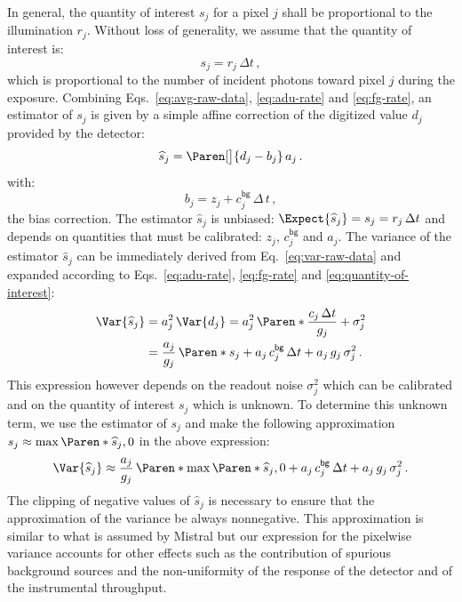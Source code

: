 \documentclass[a4paper,11pt,twoside]{scrartcl}
\newcommand*{\Tag}[1]{\mathsf{#1}}
\newcommand*{\estim}[1]{\widehat{#1}}
\theoremstyle{plain} %
\theoremstyle{definition}
\theoremstyle{remark}
\begin{document}
In general, the quantity of interest $s_j$ for a pixel $j$ shall be
proportional to the illumination $r_j$.  Without loss of generality, we assume
that the quantity of interest is:
\begin{equation}
  s_j = r_j\,\Delta t \, ,
  \label{eq:quantity-of-interest}
\end{equation}
which is proportional to the number of incident photons toward pixel $j$ during
the exposure. Combining Eqs.~\eqref{eq:avg-raw-data}, \eqref{eq:adu-rate} and
\eqref{eq:fg-rate}, an estimator of $s_j$ is given by a simple affine
correction of the digitized value $d_j$ provided by the detector:
\begin{equation}
  \estim{s}_j
  = \Paren[\big]{d_j - b_j}\,a_j \, .
  \label{eq:affine-correction}
\end{equation}
with:
\begin{equation}
  b_j = z_j + c^\Tag{bg}_j\,\Delta\,t \, ,
  \label{eq:bias-correction}
\end{equation}
the bias correction. The estimator $\estim{s}_j$ is unbiased:
$\Expect{\estim{s}_j} = s_j = r_j\,\Delta t$ and depends on quantities that
must be calibrated: $z_j$, $c^\Tag{bg}_j$ and $a_j$. The variance of the
estimator $\estim{s}_j$ can be immediately derived from
Eq.~\eqref{eq:var-raw-data} and expanded according to Eqs.~\eqref{eq:adu-rate},
\eqref{eq:fg-rate} and \eqref{eq:quantity-of-interest}:
\begin{align}
  \Var{\estim{s}_j}
  &= a_j^2\,\Var{d_j}
  = a_j^2\,\Paren*{\frac{c_j\,\Delta t}{g_j} + \sigma_j^2} \notag\\
  &= \frac{a_j}{g_j}\,\Paren*{
    s_j + a_j\,c^\Tag{bg}_j\,\Delta t + a_j\,g_j\,\sigma_j^2
  } \, .
  \label{eq:var-estimator}
\end{align}
This expression however depends on the readout noise $\sigma_j^2$ which can be
calibrated and on the quantity of interest $s_j$ which is unknown. To determine
this unknown term, we use the estimator of $s_j$ and make the following
approximation $s_j \approx \max\Paren*{\estim{s}_j, 0}$ in the above expression:
\begin{equation}
  \Var{\estim{s}_j}
  \approx \frac{a_j}{g_j}\,\Paren*{
    \max\Paren*{\estim{s}_j, 0} + a_j\,c^\Tag{bg}_j\,\Delta t +
    a_j\,g_j\,\sigma_j^2
  } \, .
  \label{eq:approx-var-estimator}
\end{equation}
The clipping of negative values of $\estim{s}_j$ is necessary to ensure that
the approximation of the variance be always nonnegative. This approximation is
similar to what is assumed by Mistral \citep{Mugnier_et_al-2004-Mistral} but
our expression for the pixelwise variance accounts for other effects such as
the contribution of spurious background sources and the non-uniformity of the
response of the detector and of the instrumental throughput.
\end{document}
